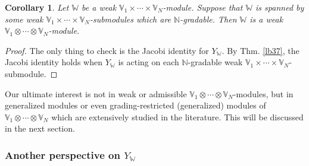 \documentclass[11pt,b5paper,notitlepage]{article}
\theoremstyle{definition}
\theoremstyle{plain}
\newtheorem{co}[df]{Corollary}
\newcommand{\Vbb}{\mathbb V}
\newcommand{\Wbb}{\mathbb W}
\newcommand{\Nbb}{\mathbb N}
\newcommand{\<}{\left\langle}
\renewcommand{\>}{\right\rangle}
\numberwithin{equation}{subsection}
\begin{document}
\begin{co}\label{lb38}
Let $\Wbb$ be a weak $\Vbb_1\times\cdots\times\Vbb_N$-module. Suppose that $\Wbb$ is spanned by some weak  $\Vbb_1\times\cdots\times\Vbb_N$-submodules which are $\Nbb$-gradable. Then $\Wbb$ is a weak $\Vbb_1\otimes\cdots\otimes\Vbb_N$-module.
\end{co}

\begin{proof}
The only thing to check is the Jacobi identity for $Y_\Wbb$. By Thm. \ref{lb37}, the Jacobi identity holds when $Y_\Wbb$ is acting on each $\Nbb$-gradable weak $\Vbb_1\times\cdots\times\Vbb_N$-submodule.
\end{proof}

Our ultimate interest is not in weak or admissible $\Vbb_1\otimes\cdots\otimes\Vbb_N$-modules, but in generalized modules or even grading-restricted (generalized) modules of $\Vbb_1\otimes\cdots\otimes\Vbb_N$ which are extensively studied in the literature. This will be discussed in the next section.








\subsubsection{Another perspective on $Y_\Wbb$}\label{lb28}
\end{document}
